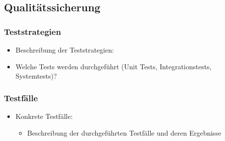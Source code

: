 \subsection{Qualitätssicherung}\label{qualituxe4tssicherung}

\subsubsection{Teststrategien}\label{teststrategien}

\begin{itemize}
  \item
        Beschreibung der Teststrategien:
  \item
        Welche Tests werden durchgeführt (Unit Tests, Integrationstests, Systemtests)?
\end{itemize}

\subsubsection{Testfälle}\label{testfuxe4lle}

\begin{itemize}
  \item
        Konkrete Testfälle:

        \begin{itemize}

          \item
                Beschreibung der durchgeführten Testfälle und deren Ergebnisse
        \end{itemize}
\end{itemize}